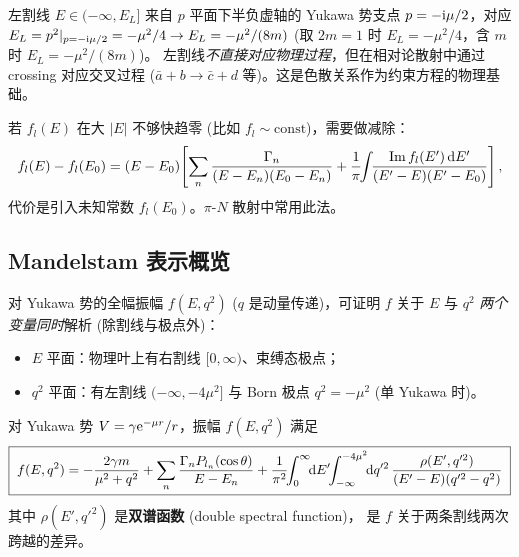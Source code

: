 \begin{remark}[左割线的物理解释]\label{rem:anlyt-leftcut}
左割线 $E\in(-\infty,E_L]$ 来自 $p$ 平面下半负虚轴的 Yukawa 势支点
$p=-\mathrm{i}\mu/2$，对应 $E_L=p^2|_{p=-\mathrm{i}\mu/2}=-\mu^2/4\to E_L=-\mu^2/(8m)$
(取 $2m=1$ 时 $E_L=-\mu^2/4$，含 $m$ 时 $E_L=-\mu^2/(8m)$)。
左割线\emph{不直接对应物理过程}，但在相对论散射中通过 crossing 对应交叉过程
($\bar a+b\to\bar c+d$ 等)。这是色散关系作为约束方程的物理基础。
\end{remark}

\begin{remark}\label{rem:anlyt-subtraction}
若 $f_l(E)$ 在大 $|E|$ 不够快趋零 (比如 $f_l\sim\mathrm{const}$)，需要做减除：
\begin{equation}
f_l(E)-f_l(E_0) = (E-E_0)\!\left[\sum_n\frac{\Gamma_n}{(E-E_n)(E_0-E_n)}
+\frac{1}{\pi}\!\!\int\!\!\frac{\Im f_l(E')\,\mathrm{d} E'}{(E'-E)(E'-E_0)}\right],
\label{eq:anlyt-disp-subtracted}
\end{equation}
代价是引入未知常数 $f_l(E_0)$。$\pi$-$N$ 散射中常用此法。
\end{remark}

\subsection{Mandelstam 表示概览}\label{ssec:anlyt-mandelstam}

对 Yukawa 势的全幅振幅 $f(E,q^2)$ ($q$ 是动量传递)，可证明 $f$ 关于
$E$ 与 $q^2$ \emph{两个变量同时}解析 (除割线与极点外)：
\begin{itemize}
\item $E$ 平面：物理叶上有右割线 $[0,\infty)$、束缚态极点；
\item $q^2$ 平面：有左割线 $(-\infty,-4\mu^2]$ 与 Born 极点 $q^2=-\mu^2$
(单 Yukawa 时)。
\end{itemize}

\begin{theorem*}
对 Yukawa 势 $V=\gamma\mathrm{e}^{-\mu r}/r$，振幅 $f(E,q^2)$ 满足
\begin{equation}
\boxed{\;f(E,q^2)=-\frac{2\gamma m}{\mu^2+q^2}
+\sum_n\frac{\Gamma_n P_{l_n}(\cos\theta)}{E-E_n}
+\frac{1}{\pi^2}\!\!\int_0^\infty\!\!\rmd E'\!\!\int_{-\infty}^{-4\mu^2}\!\!\rmd q'^2\,
\frac{\rho(E',q'^2)}{(E'-E)(q'^2-q^2)}\;}
\label{eq:anlyt-mandelstam}
\end{equation}
其中 $\rho(E',q'^2)$ 是\textbf{双谱函数} (double spectral function)，
是 $f$ 关于两条割线两次跨越的差异。
\end{theorem*}

